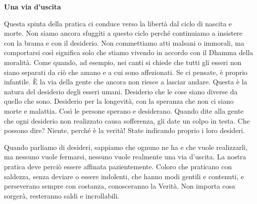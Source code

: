 \textbf{Una via d'uscita}

Questa spinta della pratica ci conduce verso la libertà dal ciclo di
nascita e morte. Non siamo ancora sfuggiti a questo ciclo perché
continuiamo a insistere con la brama e con il desiderio. Non commettiamo
atti malsani o immorali, ma comportarsi così significa solo che stiamo
vivendo in accordo con il Dhamma della moralità. Come quando, ad
esempio, nei canti si chiede che tutti gli esseri non siano separati da
ciò che amano e a cui sono affezionati. Se ci pensate, è proprio
infantile. È la via della gente che ancora non riesce a lasciar andare.
Questa è la natura del desiderio degli esseri umani. Desiderio che le
cose siano diverse da quello che sono. Desiderio per la longevità, con
la speranza che non ci siano morte e malattia. Così le persone sperano e
desiderano. Quando dite alla gente che ogni desiderio non realizzato
causa sofferenza, gli date un colpo in testa. Che possono dire? Niente,
perché è la verità! State indicando proprio i loro desideri.

Quando parliamo di desideri, sappiamo che ognuno ne ha e che vuole
realizzarli, ma nessuno vuole fermarsi, nessuno vuole realmente una via
d'uscita. La nostra pratica deve perciò essere affinata pazientemente.
Coloro che praticano con saldezza, senza deviare o essere indolenti, che
hanno modi gentili e contenuti, e perseverano sempre con costanza,
conosceranno la Verità. Non importa cosa sorgerà, resteranno saldi e
incrollabili.

